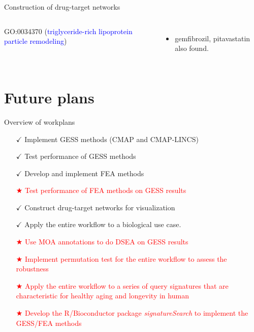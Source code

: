 \documentclass[10pt]{beamer}
\begin{document}
\begin{frame}{Construction of drug-target networks}
\begin{columns}
    GO:0034370  (\textcolor{blue}{triglyceride-rich lipoprotein particle remodeling})
    \begin{itemize}
        \item gemfibrozil, pitavastatin also found. 
    \end{itemize}
\end{columns}
\end{frame}
\section{Future plans}
\begin{frame}{Overview of workplans}
\vspace{-0.3cm}
  \begin{itemize}
    \item[{$\checkmark$}] Implement GESS methods (CMAP and CMAP-LINCS)
    \item[{$\checkmark$}] Test performance of GESS methods
    \item[{$\checkmark$}] Develop and implement FEA methods
    \item[\textcolor{red}{$\bigstar$}] \textcolor{red}{Test performance of FEA methods on GESS results}
    \item[{$\checkmark$}] Construct drug-target networks for visualization
    \item[{$\checkmark$}] Apply the entire workflow to a biological use case.
    \item[\textcolor{red}{$\bigstar$}] \textcolor{red}{Use MOA annotations to do DSEA on GESS results}
    \item[\textcolor{red}{$\bigstar$}] \textcolor{red}{Implement permutation test for the entire workflow to assess the robustness}
    \item[\textcolor{red}{$\bigstar$}] \textcolor{red}{Apply the entire workflow to a series of query signatures that are characteristic for healthy aging and longevity in human}
    \item[\textcolor{red}{$\bigstar$}] \textcolor{red}{Develop the R/Bioconductor package \emph{signatureSearch} to implement the GESS/FEA methods}
  \end{itemize}
\end{frame}
\end{document}
